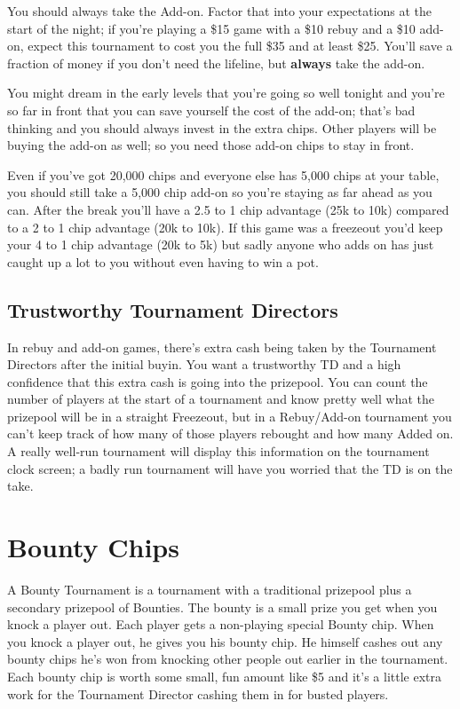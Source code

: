 You should always take the Add-on. Factor that into your expectations
at the start of the night; if you're playing a \$15 game with a \$10
rebuy and a \$10 add-on, expect this tournament to cost you the full
\$35 and at least \$25. You'll save a fraction of money if you don't
need the lifeline, but \textbf{always} take the add-on.

You might dream in the early levels that you're going so well
tonight and you're so far in front that you can save yourself
the cost of the add-on; that's bad thinking and you should always
invest in the extra chips. Other players will be buying the add-on
as well; so you need those add-on chips to stay in front.

Even if you've got 20,000 chips and everyone else has 5,000 chips at
your table, you should still take a 5,000 chip add-on so you're staying
as far ahead as you can. After the break you'll have a 2.5 to 1 chip
advantage (25k to 10k) compared to a 2 to 1 chip advantage (20k to 10k).
If this game was a freezeout you'd keep your 4 to 1 chip advantage
(20k to 5k) but sadly anyone who adds on has just caught up a lot to you
without even having to win a pot.

\subsection*{Trustworthy Tournament Directors}

In rebuy and add-on games, there's extra cash being taken by
the Tournament Directors after the initial buyin. You want
a trustworthy TD and a high confidence that this extra cash is
going into the prizepool. You can count the number of players
at the start of a tournament and know pretty well what the prizepool
will be in a straight Freezeout, but in a Rebuy/Add-on tournament
you can't keep track of how many of those players rebought and how
many Added on. A really well-run tournament will display this
information on the tournament clock screen; a badly run tournament
will have you worried that the TD is on the take.

\section{Bounty Chips}

A Bounty Tournament is a tournament with a traditional prizepool
plus a secondary prizepool of Bounties. The bounty
is a small prize you get when you knock a player out.
Each player gets a non-playing special Bounty chip.
When you knock a player out, he gives you his bounty chip.
He himself cashes out any bounty chips he's won from knocking
other people out earlier in the tournament. Each bounty chip is worth
some small, fun amount like \$5 and it's a little extra work for the
Tournament Director cashing them in for busted players.

